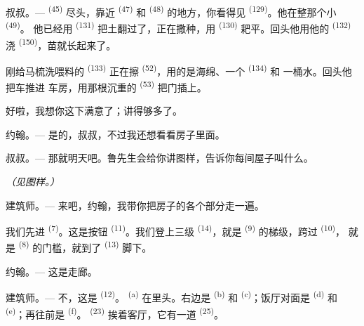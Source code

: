 \VUsaut{3.0mm}

\textsc{叔叔}。---  \textsuperscript{(45)} 尽头，靠近
\textsuperscript{(47)} 和 \textsuperscript{(48)} 的地方，你看得见
 \textsuperscript{(129)}。他在整那个小 \textsuperscript{(49)}。
他已经用 \textsuperscript{(131)} 把土翻过了，正在撒种，用
\textsuperscript{(130)} 耙平。回头他用他的 \textsuperscript{(132)} 浇
 \textsuperscript{(150)}，苗就长起来了。

刚给马梳洗喂料的 \textsuperscript{(133)} 正在擦
\textsuperscript{(52)}，用的是海绵、一个 \textsuperscript{(134)} 和
一桶水。回头他把车推进
车房，用那根沉重的 \textsuperscript{(53)} 把门插上。

好啦，我想你这下满意了；讲得够多了。

\textsc{约翰}。--- 是的，叔叔，不过我还想看看房子里面。

\textsc{叔叔}。--- 那就明天吧。鲁先生会给你讲图样，告诉你每间屋子叫什么。

\VUsaut{3.0mm}
\VUsaut{2.4mm}

{\centering\textit{（见图样。）}\par}
\VUsaut{2.4mm}

\textsc{建筑师}。--- 来吧，约翰，我带你把房子的各个部分走一遍。

我们先进 \textsuperscript{(7)}。这是按钮
\textsuperscript{(11)}。我们登上三级 \textsuperscript{(14)}，就是
 \textsuperscript{(9)} 的梯级，跨过 \textsuperscript{(10)}，
就是 \textsuperscript{(8)} 的门槛，就到了 \textsuperscript{(13)} 脚下。

\textsc{约翰}。--- 这是走廊。

\textsc{建筑师}。--- 不，这是 \textsuperscript{(12)}。
\textsuperscript{(a)} 在里头。右边是 \textsuperscript{(b)} 和
 \textsuperscript{(c)}；饭厅对面是 \textsuperscript{(d)}
和 \textsuperscript{(e)}；再往前是 \textsuperscript{(f)}。
 \textsuperscript{(23)} 挨着客厅，它有一道
\textsuperscript{(25)}。


